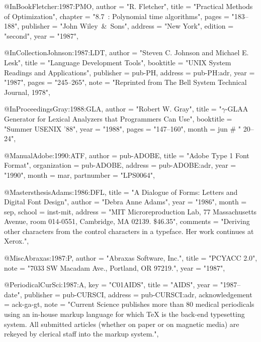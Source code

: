 @InBook{Fletcher:1987:PMO,
  author =       "R. Fletcher",
  title =        "Practical Methods of Optimization",
  chapter =      "8.7~: {P}olynomial time algorithms",
  pages =        "183--188",
  publisher =    "John Wiley~\&~Sons",
  address =      "New York",
  edition =      "second",
  year =         "1987",
}

@InCollection{Johnson:1987:LDT,
  author =       "Steven C. Johnson and Michael E. Lesk",
  title =        "Language Development Tools",
  booktitle =    "{UNIX} System Readings and Applications",
  publisher =    pub-PH,
  address =      pub-PH:adr,
  year =         "1987",
  pages =        "245--265",
  note =         "Reprinted from {T}he {B}ell {S}ystem {T}echnical
                 {J}ournal, 1978",
}

@InProceedings{Gray:1988:GLA,
  author =       "Robert W. Gray",
  title =        "$\gamma$-{GLA}\emdash A Generator for Lexical
                 Analyzers that Programmers Can Use",
  booktitle =    "Summer USENIX '88",
  year =         "1988",
  pages =        "147--160",
  month =        jun # " 20--24",
}

@Manual{Adobe:1990:ATF,
  author =       pub-ADOBE,
  title =        "Adobe Type 1 Font Format",
  organization = pub-ADOBE,
  address =      pub-ADOBE:adr,
  year =         "1990",
  month =        mar,
  partnumber =   "LPS0064",
}

@Mastersthesis{Adams:1986:DFL,
  title =        "A Dialogue of Forms: Letters and Digital Font Design",
  author =       "Debra Anne Adams",
  year =         "1986",
  month =        sep,
  school =       inst-mit,
  address =      "MIT Microreproduction Lab, 77 Massachusetts Avenue,
                 room 014-0551, Cambridge, MA 02139. \$46.35",
  comments =     "Deriving other characters from the control characters
                 in a typeface. Her work continues at Xerox.",
}

@Misc{Abraxas:1987:P,
  author =       "{Abraxas Software, Inc.}",
  title =        "{PCYACC} 2.0",
  note =         "7033 SW Macadam Ave., Portland, OR 97219.",
  year =         "1987",
}

@Periodical{CurSci:1987:A,
  key =          "C01AIDS",
  title =        "{AIDS}",
  year =         "1987--date{}",
  publisher =    pub-CURSCI,
  address =      pub-CURSCI:adr,
  acknowledgement = ack-ga-gt,
  note =         "Current Science publishes more than 80 medical
                 periodicals using an in-house markup language for
                 which {\TeX} is the back-end typesetting system. All
                 submitted articles (whether on paper or on magnetic
                 media) are rekeyed by clerical staff into the markup
                 system.",
}

